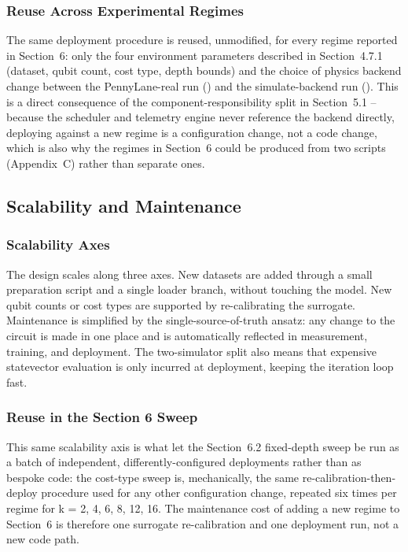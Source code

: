 \subsubsection{Reuse Across Experimental Regimes}
The same deployment procedure is reused, unmodified, for every regime reported in Section~6: only the four environment parameters described in Section~4.7.1 (dataset, qubit count, cost type, depth bounds) and the choice of physics backend change between the PennyLane-real run () and the simulate-backend run (). This is a direct consequence of the component-responsibility split in Section~5.1 -- because the scheduler and telemetry engine never reference the backend directly, deploying against a new regime is a configuration change, not a code change, which is also why the regimes in Section~6 could be produced from two scripts (Appendix~C) rather than separate ones.

\subsection{Scalability and Maintenance}

\subsubsection{Scalability Axes}
The design scales along three axes. New datasets are added through a small preparation script and a single loader branch, without touching the model. New qubit counts or cost types are supported by re-calibrating the surrogate. Maintenance is simplified by the single-source-of-truth ansatz: any change to the circuit is made in one place and is automatically reflected in measurement, training, and deployment. The two-simulator split also means that expensive statevector evaluation is only incurred at deployment, keeping the iteration loop fast.

\subsubsection{Reuse in the Section 6 Sweep}
This same scalability axis is what let the Section~6.2 fixed-depth sweep be run as a batch of independent, differently-configured deployments rather than as bespoke code: the cost-type sweep is, mechanically, the same re-calibration-then-deploy procedure used for any other configuration change, repeated six times per regime for k = 2, 4, 6, 8, 12, 16. The maintenance cost of adding a new regime to Section~6 is therefore one surrogate re-calibration and one deployment run, not a new code path.

